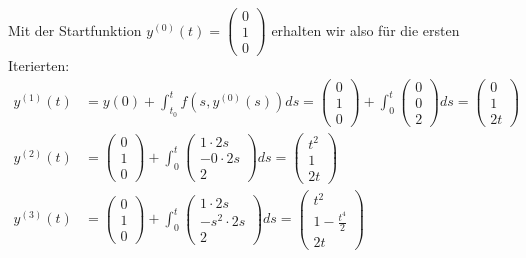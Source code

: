 \begin{solution}
Mit der Startfunktion $y^{(0)}(t) = \begin{pmatrix}
0 \\ 1 \\ 0
\end{pmatrix}$ erhalten wir also für die ersten Iterierten:
\begin{align}
    y^{(1)}(t) &= y(0) + \int_{t_{0}}^{t}f(s,y^{(0)}(s))ds = \begin{pmatrix}
        0 \\ 1 \\ 0
    \end{pmatrix} + \int_{0}^{t}
    \begin{pmatrix}
        0 \\ 0 \\ 2
    \end{pmatrix} ds =
    \begin{pmatrix}
        0 \\ 1 \\ 2t
    \end{pmatrix} \\
    y^{(2)}(t) &=
    \begin{pmatrix}
        0 \\ 1 \\ 0
    \end{pmatrix} + \int_{0}^{t}
    \begin{pmatrix}
        1\cdot 2s \\ -0 \cdot 2s \\ 2
    \end{pmatrix} ds =
    \begin{pmatrix}
        t^{2} \\ 1 \\ 2t
    \end{pmatrix} \\
    y^{(3)}(t) &=
    \begin{pmatrix}
        0 \\ 1 \\ 0
    \end{pmatrix} + \int_{0}^{t}
    \begin{pmatrix}
        1 \cdot 2s \\ -s^{2}\cdot 2s \\ 2
    \end{pmatrix} ds =
    \begin{pmatrix}
        t^{2} \\ 1-\frac{t^{4}}{2} \\ 2t
    \end{pmatrix}
\end{align}


\end{solution}
